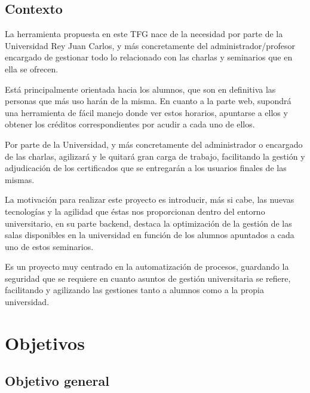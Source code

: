 \documentclass[a4paper, 12pt]{book}
\begin{document}
\section{Contexto}
\label{sec:contexto}
La herramienta propuesta en este TFG nace de la necesidad por parte de la Universidad Rey Juan Carlos, y más concretamente del administrador/profesor encargado de gestionar todo lo relacionado con las charlas y seminarios que en ella se ofrecen.

Está principalmente orientada hacia los alumnos, que son en definitiva las personas que más uso harán de la misma. En cuanto a la parte web, supondrá una herramienta de fácil manejo donde ver estos horarios, apuntarse a ellos y obtener los créditos correspondientes por acudir a cada uno de ellos.

Por parte de la Universidad, y más concretamente del administrador o encargado de las charlas, agilizará y le quitará gran carga de trabajo, facilitando la gestión y adjudicación de los certificados que se entregarán a los usuarios finales de las mismas.

La motivación para realizar este proyecto es introducir, más si cabe, las nuevas tecnologías y la agilidad que éstas nos proporcionan dentro del entorno universitario, en su parte backend, destaca la optimización de la gestión de las salas disponibles en la universidad en función de los alumnos apuntados a cada uno de estos seminarios.

Es un proyecto muy centrado en la automatización de procesos, guardando la seguridad que se requiere en cuanto asuntos de gestión universitaria se refiere, facilitando y agilizando las gestiones tanto a alumnos como a la propia universidad.



\cleardoublepage %
\chapter{Objetivos} %
\label{chap:objetivos} %

\section{Objetivo general} %
\label{sec:objetivo-general} %
\end{document}
